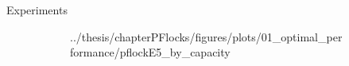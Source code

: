 \begin{frame}{Experiments}
\begin{figure}
\begin{subfigure}[t]{0.32\textwidth}
{            {../thesis/chapterPFlocks/figures/plots/01_optimal_performance/pflockE5_by_capacity}}
        \end{subfigure}
        \hfill
        \begin{subfigure}[t]{0.32\textwidth}
        \end{subfigure}
        \begin{subfigure}[t]{0.32\textwidth}
\end{subfigure}
\end{figure}
\end{frame}
